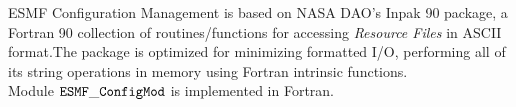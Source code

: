 

      ESMF Configuration Management is based on NASA DAO's 
      Inpak 90 package, a Fortran 90 collection of routines/functions
      for accessing {\em Resource Files} in ASCII format.The package 
      is optimized for minimizing formatted I/O, performing all of its 
      string operations in memory using Fortran intrinsic functions.\\

      Module ${\tt ESMF\_ConfigMod}$ is implemented in Fortran.



